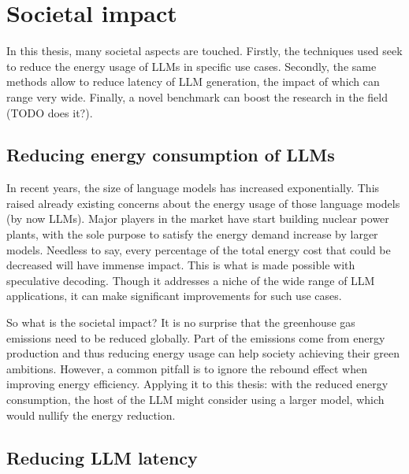 
\chapter{Societal impact}

In this thesis, many societal aspects are touched. Firstly, the techniques used seek to reduce the energy usage of LLMs in specific use cases. Secondly, the same methods allow to reduce latency of LLM generation, the impact of which can range very wide. Finally, a novel benchmark can boost the research in the field (TODO does it?).

\section{Reducing energy consumption of LLMs}

In recent years, the size of language models has increased exponentially. This raised already existing concerns about the energy usage of those language models (by now LLMs). Major players in the market have start building nuclear power plants, with the sole purpose to satisfy the energy demand increase by larger models. Needless to say, every percentage of the total energy cost that could be decreased will have immense impact. This is what is made possible with speculative decoding. Though it addresses a niche of the wide range of LLM applications, it can make significant improvements for such use cases. 

So what is the societal impact? It is no surprise that the greenhouse gas emissions need to be reduced globally. Part of the emissions come from energy production and thus reducing energy usage can help society achieving their green ambitions. However, a common pitfall is to ignore the rebound effect when improving energy efficiency. Applying it to this thesis: with the reduced energy consumption, the host of the LLM might consider using a larger model, which would nullify the energy reduction. 

\section{Reducing LLM latency}

